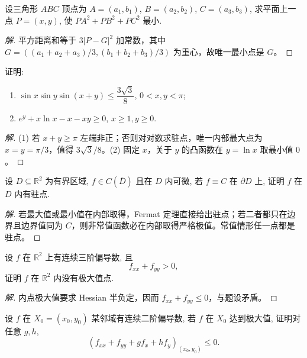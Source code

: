 \documentclass[../../数学分析培优讲义(答案版).tex]{subfiles}
\begin{document}
\begin{example}
设三角形 $ABC$ 顶点为 $A=(a_1,b_1)$, $B=(a_2,b_2)$, $C=(a_3,b_3)$, 求平面上一点 $P=(x,y)$, 使 $PA^2+PB^2+PC^2$ 最小.
\end{example}

\begin{proof}[解]
平方距离和等于 $3|P-G|^2$ 加常数，其中
$G=((a_1+a_2+a_3)/3,(b_1+b_2+b_3)/3)$ 为重心，故唯一最小点是 $G$。
\end{proof}

\begin{example}
证明:
\begin{enumerate}[label=(\arabic*)]
    \item $\sin x\sin y\sin(x+y)\leq\dfrac{3\sqrt{3}}{8}$, $0<x,y<\pi$;
    \item $e^y+x\ln x-x-xy\geq0$, $x\geq1,y\geq0$.
\end{enumerate}
\end{example}

\begin{proof}[解]
(1) 若 $x+y\geq\pi$ 左端非正；否则对对数求驻点，唯一内部最大点为 $x=y=\pi/3$，值得 $3\sqrt{3}/8$。(2) 固定 $x$，关于 $y$ 的凸函数在 $y=\ln x$ 取最小值 $0$。
\end{proof}

\begin{example}
设 $D\subseteq\mathbb{R}^2$ 为有界区域, $f\in C(\overline D)$ 且在 $D$ 内可微, 若 $f\equiv C$ 在 $\partial D$ 上, 证明 $f$ 在 $D$ 内有驻点.
\end{example}

\begin{proof}[解]
若最大值或最小值在内部取得，Fermat 定理直接给出驻点；若二者都只在边界且边界值同为 $C$，则非常值函数必在内部取得严格极值。常值情形任一点都是驻点。
\end{proof}

\begin{example}
设 $f$ 在 $\mathbb{R}^2$ 上有连续三阶偏导数, 且
\[
    f_{xx}+f_{yy}>0,
\]
证明 $f$ 在 $\mathbb{R}^2$ 内没有极大值点.
\end{example}

\begin{proof}[解]
内点极大值要求 Hessian 半负定，因而 $f_{xx}+f_{yy}\leq0$，与题设矛盾。
\end{proof}

\begin{example}
设 $f$ 在 $X_0=(x_0,y_0)$ 某邻域有连续二阶偏导数, 若 $f$ 在 $X_0$ 达到极大值, 证明对任意 $g,h$,
\[
    \left(f_{xx}+f_{yy}+gf_x+hf_y\right)_{(x_0,y_0)}\leq0.
\]
\end{example}
\end{document}
